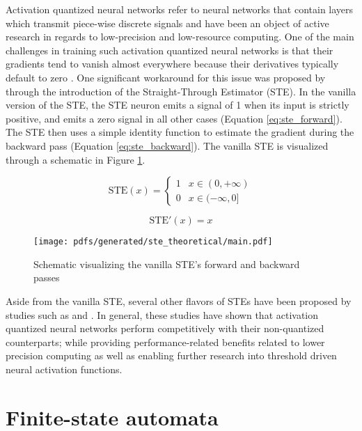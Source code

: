 Activation quantized neural networks refer to neural networks that contain
layers which transmit piece-wise discrete signals and have been an object of
active research in regards to low-precision and low-resource computing. One of
the main challenges in training such activation quantized neural networks is
that their gradients tend to vanish almost everywhere because their derivatives
typically default to zero
\citep{bengio2013estimating,courbariaux2016binarized,yin2019understanding}. One
significant workaround for this issue was proposed by
\citet{bengio2013estimating} through the introduction of the Straight-Through
Estimator (STE). In the vanilla version of the STE, the STE neuron emits a
signal of 1 when its input is strictly positive, and emits a zero signal in all
other cases (Equation \ref{eq:ste_forward}). The STE then uses a simple identity
function to estimate the gradient during the backward pass (Equation
\ref{eq:ste_backward}). The vanilla STE is visualized through a schematic in
Figure \ref{fig:ste}.

\begin{equation}
  \label{eq:ste_forward}
  \text{STE}(x)=
  \begin{cases}
    1 & x \in (0, +\infty) \\
    0 & x \in (-\infty, 0]
  \end{cases}
\end{equation}

\begin{equation}
  \label{eq:ste_backward}
  \text{STE}'(x)= x
\end{equation}

\begin{figure}[t]
  \centering
  \texttt{[image: pdfs/generated/ste\_theoretical/main.pdf]}
  \caption{Schematic visualizing the vanilla STE's forward and backward passes}
  \label{fig:ste}
\end{figure}

Aside from the vanilla STE, several other flavors of STEs have been proposed by
studies such as \citet{courbariaux2016binarized} and
\citet{yin2019understanding}. In general, these studies have shown that
activation quantized neural networks perform competitively with their
non-quantized counterparts; while providing performance-related benefits related
to lower precision computing as well as enabling further research into threshold
driven neural activation functions.

\section{Finite-state automata}

